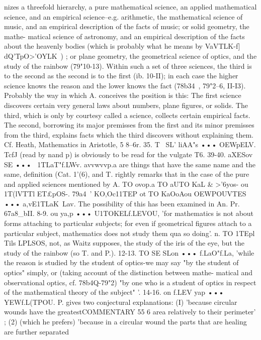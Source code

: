 {{{{{{{{{{{{{{nizes a threefold hierarchy, a pure mathematical science, an
applied mathematical science, and an empirical science--e.g.
arithmetic, the mathematical science of music, and an empirical
description of the facts of music; or solid geometry, the mathe-
matical science of astronomy, and an empirical description of
the facts about the heavenly bodies (which is probably what he
means by VaVTLK-f] dQ'TpO>'OYLK~) ; or plane geometry, the geometrical
science of optics, and the study of the rainbow (79"10-13). Within
such a set of three sciences, the third is to the second as the
second is to the first (ib. 10-II); in each case the higher science
knows the reason and the lower knows the fact (78b34~, 79"2--6,
II-I3). Probably the way in which A. conceives the position is
this: The first science discovers certain very general laws about
numbers, plane figures, or solids. The third, which is only by
courtesy called a science, collects certain empirical facts. The
second, borrowing its major premisses from the first and its minor
premisses from the third, explains facts which the third discovers
without explaining them. Cf. Heath, Mathematics in Aristotle,
5 8--6r.
35. T~ SL' liAA"s ••• OEWpELV. TcfJ (read by nand p) is obviously
to be read for the vulgate T6.
39-40. aXESov SE ••• ~1TLaT"f.LWv. avvwvvp.a are things that
have the same name and the same, definition (Cat. 1'(6), and T.
rightly remarks that in the case of the pure and applied sciences
mentioned by A. TO ovop.a TO aUTO KaL & >'6yos- ou 1T(lVTTl ET£pOS-.
79a4~'
KO,Oc11TEP ot TO KaOoAou OEWPOUVTES ••• a,vE1TLaK~Lav.
The possibility of this has been examined in An. Pr. 67a8_bII.
8-9. ou ya,p ••• U1TOKELf.LEVOU, 'for mathematics is not about
forms attaching to particular subjects; for even if geometrical
figures attach to a particular subject, mathematics does not study
them qua so doing'.
n. TO 1TEpl Tils LPLSOS, not, as Waitz supposes, the study of the
iris of the eye, but the study of the rainbow (so T. and P.).
12-13. TO SE SLon ••• f.LaO"f.La, 'while the reason is studied by
the student of optics-we may say "by the student of optics"
simply, or (taking account of the distinction between mathe-
matical and observational optics, cf. 78b4Q-79"2) "by one who
is a student of optics in respect of the mathematical theory of
the subject" '.
14-16. on f.LEV yap ••• YEWf.L(TPOU. P. gives two conjectural
explanations: (I) 'because circular wounds have the greatestCOMMENTARY
55 6
area relatively to their perimeter' ; (2) (which he prefers) 'because
in a circular wound the parts that are healing are further separated
}}}}}}}}}}}}}}
